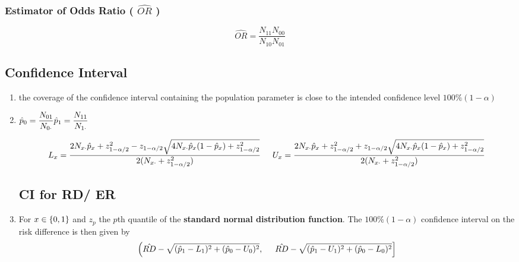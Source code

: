 \subsubsection{Estimator of Odds Ratio ( $\hat{OR}$ ) \cite{ism-1}}\label{Estimator of Odds Ratio}

\[
    \hat{OR}
    = \dfrac{N_{11}N_{00}}{N_{10}N_{01}}
\]



\subsection{Confidence Interval \cite{ism-1}} \label{Measures of risk: Confidence Interval}

\begin{enumerate}[itemsep=0.2cm]
    \item the coverage of the confidence interval containing the population parameter is close to the intended confidence level $100\%(1 - \alpha)$

    \item 
    $
        \hfill
        \hat{p}_0 = \dfrac{N_{01}}{N_{0\cdot}}
        \hfill
        \hat{p}_1 = \dfrac{N_{11}}{N_{1\cdot}}
        \hfill
    $

    \[
        \hfill
        L_{x}
        = \dfrac{
            2N_{x\cdot} \hat{p}_x + z^2_{1 - \alpha/2} 
            - z_{1 - \alpha/2} \sqrt{4N_{x\cdot} \hat{p}_x (1- \hat{p}_x) + z^2_{1 - \alpha/2}}
        }{
            2(N_{x\cdot} + z^2_{1 - \alpha/2} )
        }
        \hspace{0.5cm}
        U_{x}
        = \dfrac{
            2N_{x\cdot} \hat{p}_x + z^2_{1 - \alpha/2} 
            + z_{1 - \alpha/2} \sqrt{4N_{x\cdot} \hat{p}_x (1- \hat{p}_x) + z^2_{1 - \alpha/2}}
        }{
            2(N_{x\cdot} + z^2_{1 - \alpha/2} )
        }
        \hfill
    \]

    \subsection*{CI for RD/ ER \cite{ism-1}}

    \item For $x \in \left\{0, 1\right\}$ and $z_p$ the $p$th quantile of the \textbf{standard normal distribution function}. The $100\%(1 - \alpha)$ confidence interval on the risk difference is then given by
    \[
        \hfill
        \left(
            \hat{RD} - \sqrt{(\hat{p}_1 - L_1)^2 + (\hat{p}_0 - U_0)^2},
            \hspace{0.5cm}
            \hat{RD} - \sqrt{(\hat{p}_1 - U_1)^2 + (\hat{p}_0 - L_0)^2}
        \right]
        \hfill
    \]


\end{enumerate}
